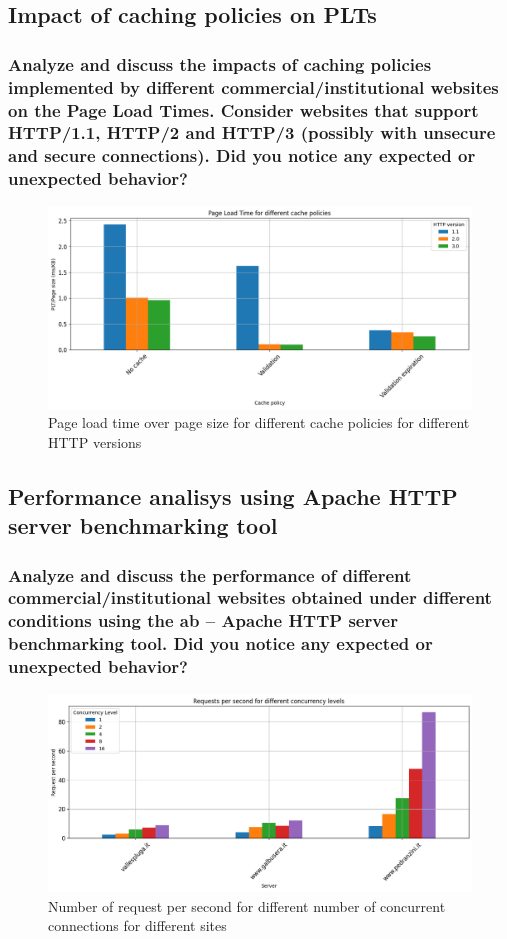 \documentclass[eng]{class}
\begin{document}
\pagestyle{OtherPage}
\subsection{Impact of caching policies on PLTs}
\subsubsection*{Analyze and discuss the impacts of caching policies implemented by different
  commercial/institutional websites on the Page Load Times. Consider websites that support
  HTTP/1.1, HTTP/2 and HTTP/3 (possibly with unsecure and secure connections). Did you notice
  any expected or unexpected behavior?}


\begin{figure}[H]
  \centering
  \includegraphics[width=\columnwidth]{images/plt_cache_policy.png}
  \caption{Page load time over page size for different cache policies for different HTTP versions}
  \label{fig-2}
\end{figure}

\subsection{Performance analisys using  Apache HTTP server benchmarking tool}
\subsubsection*{Analyze and discuss the performance of different commercial/institutional websites obtained
  under different conditions using the ab – Apache HTTP server benchmarking tool. Did you
  notice any expected or unexpected behavior?}

\begin{figure}[H]
  \centering
  \includegraphics[width=\columnwidth]{images/Request_per_second_diff_conc.png}
  \caption{Number of request per second for different number of concurrent connections for different sites}
  \label{fig-3}
\end{figure}
\end{document}
